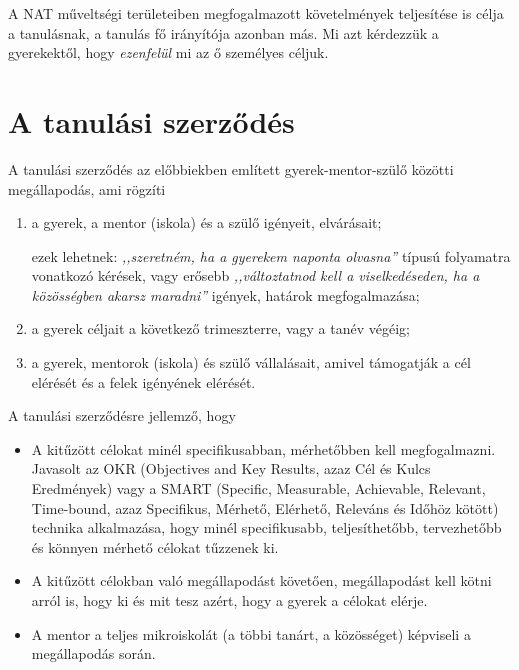 A NAT műveltségi területeiben megfogalmazott követelmények teljesítése is célja
a tanulásnak, a tanulás fő irányítója azonban más. Mi azt kérdezzük a
gyerekektől, hogy \emph{ezenfelül} mi az ő személyes céljuk.

\section{A tanulási szerződés}

A tanulási szerződés az előbbiekben említett gyerek-mentor-szülő közötti
megállapodás, ami rögzíti
\begin{enumerate}
      \item a gyerek, a mentor (iskola) és a szülő igényeit, elvárásait;

            ezek lehetnek: \emph{,,szeretném, ha a gyerekem naponta olvasna''}
            típusú
            folyamatra vonatkozó kérések, vagy erősebb \emph{,,változtatnod
                  kell a
                  viselkedéseden, ha a közösségben akarsz maradni''} igények,
            határok
            megfogalmazása;

      \item a gyerek céljait a következő trimeszterre, vagy a tanév végéig;

      \item a gyerek, mentorok (iskola) és szülő vállalásait, amivel támogatják
            a
            cél
            elérését és a felek igényének elérését.

\end{enumerate}

A tanulási szerződésre jellemző, hogy
\begin{itemize}
      \item A kitűzött célokat minél specifikusabban, mérhetőbben kell
            megfogalmazni.
            Javasolt az OKR  (Objectives and Key Results, azaz	Cél és Kulcs
            Eredmények)
            \citep{okr} vagy a SMART (Specific, Measurable, Achievable,
            Relevant,
            Time-bound, azaz Specifikus,  Mérhető, Elérhető, Releváns és Időhöz
            kötött)
            \citep{wiki:smart} technika alkalmazása, hogy minél specifikusabb,
            teljesíthetőbb, tervezhetőbb és könnyen mérhető célokat tűzzenek
            ki.

      \item A kitűzött célokban való megállapodást követően, megállapodást
            kell
            kötni arról is, hogy ki és mit tesz azért, hogy a gyerek a célokat
            elérje.

      \item A mentor a teljes mikroiskolát (a többi tanárt, a közösséget)
            képviseli
            a
            megállapodás során.
\end{itemize}

